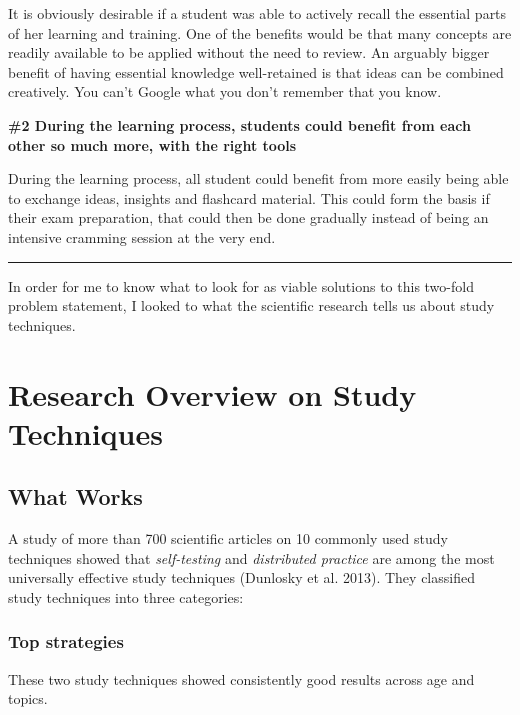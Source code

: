 It is obviously desirable if a student was able to actively recall the
essential parts of her learning and training. One of the benefits would
be that many concepts are readily available to be applied without the
need to review. An arguably bigger benefit of having essential knowledge
well-retained is that ideas can be combined creatively. You can't Google
what you don't remember that you know.

\textbf{\#2 During the learning process, students could benefit from
each other so much more, with the right tools}

During the learning process, all student could benefit from more easily
being able to exchange ideas, insights and flashcard material. This
could form the basis if their exam preparation, that could then be done
gradually instead of being an intensive cramming session at the very
end.

\begin{center}\rule{0.5\linewidth}{\linethickness}\end{center}

In order for me to know what to look for as viable solutions to this
two-fold problem statement, I looked to what the scientific research
tells us about study techniques.

\newpage

\section{Research Overview on Study
Techniques}\label{research-overview-on-study-techniques}

\hypertarget{what-works}{\subsection{What Works}\label{what-works}}

A study of more than 700 scientific articles on 10 commonly used study
techniques showed that \emph{self-testing} and \emph{distributed
practice} are among the most universally effective study techniques
(Dunlosky et al. 2013). They classified study techniques into three
categories:

\subsubsection{Top strategies}\label{top-strategies}

These two study techniques showed consistently good results across age
and topics.


